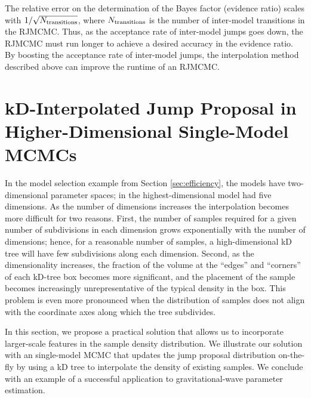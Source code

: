 \documentclass{rsos}
\begin{document}
The relative error on the determination of the Bayes factor (evidence ratio) scales
with $1/\sqrt{N_{\textnormal{transitions}}}$, where
$N_{\textnormal{transitions}}$ is the number of inter-model
transitions in the RJMCMC.  Thus, as the acceptance rate of
inter-model jumps goes down, the RJMCMC must run longer to achieve a
desired accuracy in the evidence ratio.  By boosting the acceptance
rate of inter-model jumps, the interpolation method described above
can improve the runtime of an RJMCMC.

\section{kD-Interpolated Jump Proposal in Higher-Dimensional
  Single-Model MCMCs}
\label{sec:higherdim}

In the model selection example from Section \ref{sec:efficiency}, the
models have two-dimensional parameter spaces; in \cite{Farr2010} the
highest-dimensional model had five dimensions.  As the number of
dimensions increases the interpolation becomes more difficult for two
reasons.  First, the number of samples required for a given
number of subdivisions in each dimension grows exponentially with
the number of dimensions; hence, for a reasonable number of samples, a high-dimensional kD tree will have few subdivisions along each dimension.  Second, as
the dimensionality increases, the fraction of the volume at the ``edges'' and ``corners'' of each kD-tree box becomes more significant, and the placement of the sample becomes increasingly unrepresentative of the typical density in the box.  This problem is even more
pronounced when the distribution of samples does not align with the
coordinate axes along which the tree subdivides.  

In this section, we propose a practical solution that allows us to incorporate larger-scale features in the sample density distribution.  We illustrate our solution with an single-model MCMC that updates the jump proposal distribution on-the-fly by using a kD tree to interpolate the density of existing samples.  We conclude with an example of a successful application to gravitational-wave parameter estimation.
\end{document}
